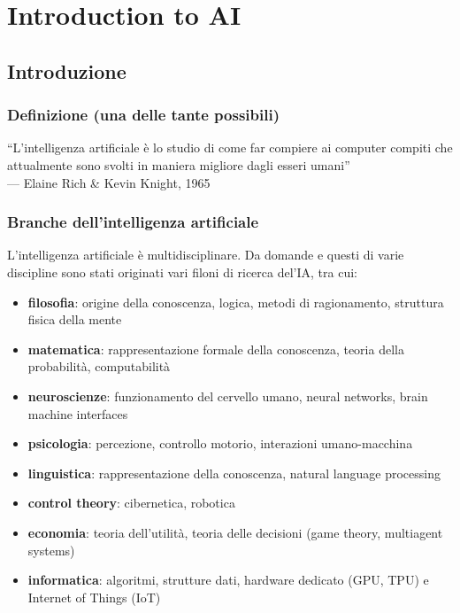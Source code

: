 \section{Introduction to AI}
\subsection{Introduzione}
\subsubsection*{Definizione (una delle tante possibili)}
\begin{center}
    ``L'intelligenza artificiale è lo studio di come far compiere ai computer compiti che attualmente sono svolti in maniera
	migliore dagli esseri umani'' \\[5pt]
    \hspace*{\fill} {--- Elaine Rich \& Kevin Knight, 1965}
\end{center}

\subsubsection*{Branche dell'intelligenza artificiale}
L'intelligenza artificiale è multidisciplinare. Da domande e questi di varie discipline sono stati originati vari filoni di
ricerca del'IA, tra cui:
\begin{itemize}
	\item \textbf{filosofia}: origine della conoscenza, logica, metodi di ragionamento, struttura fisica della mente
	\item \textbf{matematica}: rappresentazione formale della conoscenza, teoria della probabilità, computabilità
	\item \textbf{neuroscienze}: funzionamento del cervello umano, neural networks, brain machine interfaces
	\item \textbf{psicologia}: percezione, controllo motorio, interazioni umano-macchina
	\item \textbf{linguistica}: rappresentazione della conoscenza, natural language processing
	\item \textbf{control theory}: cibernetica, robotica
	\item \textbf{economia}: teoria dell'utilità, teoria delle decisioni (game theory, multiagent systems)
	\item \textbf{informatica}: algoritmi, strutture dati, hardware dedicato (GPU, TPU) e Internet of Things (IoT)
\end{itemize}

